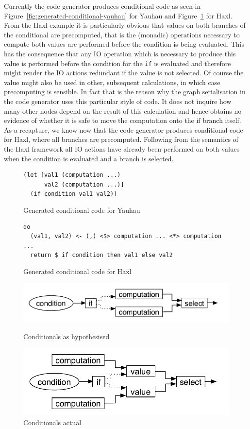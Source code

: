 Currently the code generator produces conditional code as seen in Figure~\ref{fig:generated-conditional-yauhau} for Yauhau and Figure~\ref{fig:generated-conditional-haxl} for Haxl.
From the Haxl example it is particularly obvious that values on both branches of the conditional are precomputed, that is the (monadic) operations necessary to compute both values are performed before the condition is being evaluated.
This has the consequence that any IO operation which is necessary to produce this value is performed before the condition for the \texttt{if} is evaluated and therefore might render the IO actions redundant if the value is not selected.
Of course the value might also be used in other, subsequent calculations, in which case precomputing is sensible.
In fact that is the reason why the graph serialisation in the code generator uses this particular style of code.
It does not inquire how many other nodes depend on the result of this calculation and hence obtains no evidence of whether it is safe to move the computation onto the if branch itself.
As a recapture, we know now that the code generator produces conditional code for Haxl, where all branches are precomputed.
Following from the semantics of the Haxl framework all IO actions have already been performed on both values when the condition is evaluated and a branch is selected.

\begin{figure}
\begin{verbatim}
(let [val1 (computation ...)
      val2 (computation ...)]
  (if condition val1 val2))
\end{verbatim}
\caption{Generated conditional code for Yauhau}
\label{fig:generated-conditional-yauhau}
\begin{verbatim}
do
  (val1, val2) <- (,) <$> computation ... <*> computation ...
  return $ if condition then val1 else val2
\end{verbatim}
\caption{Generated conditional code for Haxl}
\label{fig:generated-conditional-haxl}
\end{figure}

\begin{figure}
  \includegraphics[width=\textwidth]{../Figures/if-hypothesised}
  \caption{Conditionals as hypothesised}
  \label{fig:if-graph-hypothesised}
  \includegraphics[width=\textwidth]{../Figures/if-in-reality}
  \caption{Conditionals actual}
  \label{fig:if-graph-actual}
\end{figure}


